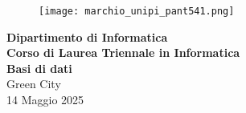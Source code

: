 \begin{titlepage} %
	\begin{figure}[t] %
		\centering\texttt{[image: marchio\_unipi\_pant541.png]}
	\end{figure}
	\vspace{20mm}
	
	\begin{Large}
		\begin{center}
			\textbf{Dipartimento di Informatica\\ Corso di Laurea Triennale in Informatica\\}
			\vspace{20mm}
			{\huge{\bf Basi di dati}}\\
			\vspace{5mm}
			{\LARGE{Green City}}\\
			{\large{14 Maggio 2025}}
		\end{center}
	\end{Large}
	
	
	\vspace{36mm}
	
\end{titlepage}